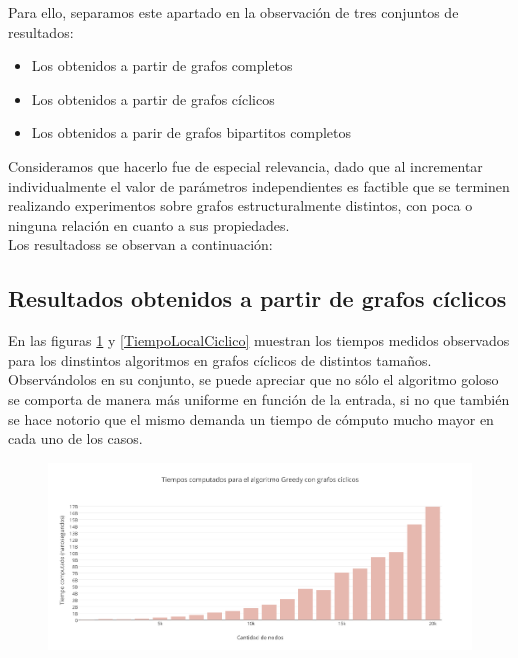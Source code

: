 Para ello, separamos este apartado en la observación de tres conjuntos de resultados:

\begin{itemize}
\item {Los obtenidos a partir de grafos completos}
\item {Los obtenidos a partir de grafos cíclicos}
\item {Los obtenidos a parir de grafos bipartitos completos}
\end{itemize}

Consideramos que hacerlo fue de especial relevancia, dado que al incrementar individualmente el valor de parámetros independientes es factible que se terminen realizando experimentos sobre grafos estructuralmente distintos, con poca o ninguna relación en cuanto a sus propiedades.\\
Los resultadoss se observan a continuación:\\


\subsection {Resultados obtenidos a partir de grafos cíclicos}

En las figuras \ref{TiempoGreedyCiclico} y \ref{TiempoLocalCiclico} muestran los tiempos medidos observados para los dinstintos algoritmos en grafos cíclicos de distintos tamaños. \\
Observándolos en su conjunto, se puede apreciar que no sólo el algoritmo goloso se comporta de manera más uniforme en función de la entrada, si no que también se hace notorio que el mismo demanda un tiempo de cómputo mucho mayor en cada uno de los casos.\\

\begin{figure}[H]
    \centering
  	\includegraphics[width=18cm]{imagenes/Ej5/TiempoGreedyCiclico.png}
    \caption{}
 	  \label{TiempoGreedyCiclico}
  \end{figure}

